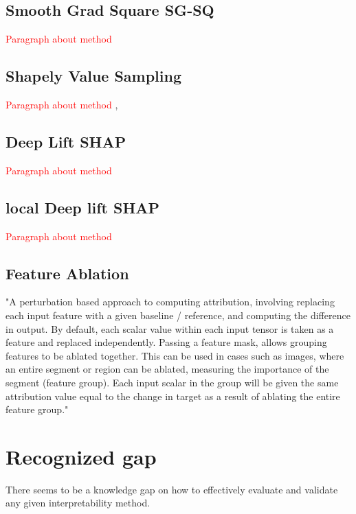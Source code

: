 \documentclass[12pt]{report}
\begin{document}
\subsection{Smooth Grad Square SG-SQ}
		\textcolor{red}{Paragraph about method} \cite{https://doi.org/10.48550/arxiv.1806.10758}


\subsection{Shapely Value Sampling}
		\textcolor{red}{Paragraph about method} \cite{CASTRO20091726}, \cite{trumbelj2010AnEE}

\subsection{Deep Lift SHAP}
		\textcolor{red}{Paragraph about method} \cite{DBLP:journals/corr/LundbergL17}


\subsection{local Deep lift SHAP}

		\textcolor{red}{Paragraph about method} \cite{https://doi.org/10.48550/arxiv.1711.06104}

\subsection{Feature Ablation}
"A perturbation based approach to computing attribution, involving replacing each input feature with a given baseline / reference, and computing the difference in output. By default, each scalar value within each input tensor is taken as a feature and replaced independently. Passing a feature mask, allows grouping features to be ablated together. This can be used in cases such as images, where an entire segment or region can be ablated, measuring the importance of the segment (feature group). Each input scalar in the group will be given the same attribution value equal to the change in target as a result of ablating the entire feature group."

\newpage
\section{Recognized gap}

There seems to be a knowledge gap on how to
effectively evaluate and validate any given interpretability method.
\end{document}

